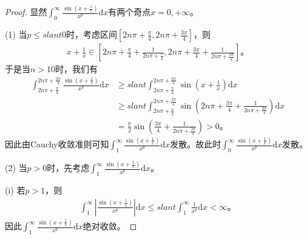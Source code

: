 \documentclass[../../main.tex]{subfiles}
\begin{document}
\begin{proof}
显然\(\int_0^{\infty}{\frac{\sin \left( x+\frac{1}{x} \right)}{x^p}\mathrm{d}x}\)有两个奇点\(x=0,+\infty\)。

(1) 当\(p\leqslant slant 0\)时，考虑区间\(\left[ 2n\pi +\frac{\pi}{4},2n\pi +\frac{3\pi}{4} \right]\)，则
\begin{align*}
x+\frac{1}{x}\in \left[ 2n\pi +\frac{\pi}{4}+\frac{1}{2n\pi +\frac{\pi}{4}},2n\pi +\frac{3\pi}{4}+\frac{1}{2n\pi +\frac{3\pi}{4}} \right]。
\end{align*}
于是当\(n>10\)时，我们有
\begin{align*}
\int_{2n\pi +\frac{\pi}{4}}^{2n\pi +\frac{3\pi}{4}}{\frac{\sin \left( x+\frac{1}{x} \right)}{x^p}\mathrm{d}x}&\geqslant slant \int_{2n\pi +\frac{\pi}{4}}^{2n\pi +\frac{3\pi}{4}}{\sin \left( x+\frac{1}{x} \right) \mathrm{d}x}\\
&\geqslant slant \int_{2n\pi +\frac{\pi}{4}}^{2n\pi +\frac{3\pi}{4}}{\sin \left( 2n\pi +\frac{3\pi}{4}+\frac{1}{2n\pi +\frac{3\pi}{4}} \right) \mathrm{d}x}\\
&=\frac{\pi}{2}\sin \left( \frac{3\pi}{4}+\frac{1}{2n\pi +\frac{3\pi}{4}} \right) >0。
\end{align*}
因此由Cauchy收敛准则可知\(\int_1^{\infty}{\frac{\sin \left( x+\frac{1}{x} \right)}{x^p}\mathrm{d}x}\)发散。故此时\(\int_0^{\infty}{\frac{\sin \left( x+\frac{1}{x} \right)}{x^p}\mathrm{d}x}\)发散。

(2) 当\(p>0\)时，先考虑\(\int_1^{\infty}{\frac{\sin \left( x+\frac{1}{x} \right)}{x^p}\mathrm{d}x}\)。

(i) 若\(p>1\)，则
\begin{align*}
\int_1^{\infty}{\left| \frac{\sin \left( x+\frac{1}{x} \right)}{x^p} \right|\mathrm{d}x}\leqslant slant \int_1^{\infty}{\frac{1}{x^p}\mathrm{d}x}<\infty。
\end{align*}
因此\(\int_1^{\infty}{\frac{\sin \left( x+\frac{1}{x} \right)}{x^p}\mathrm{d}x}\)绝对收敛。


\end{proof}
\end{document}
